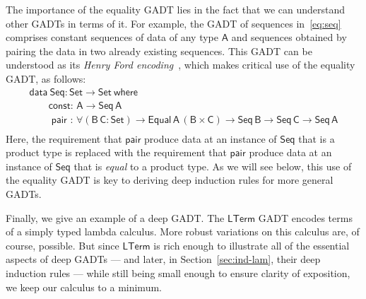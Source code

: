 \documentclass[9pt]{entcs}
\begin{document}
The importance of the equality GADT lies in the fact that we can
understand other GADTs in terms of it. For example, the GADT of
sequences in~\eqref{eq:seq} comprises constant sequences of data of
any type $\mathsf{A}$ and sequences obtained by pairing the data in
two already existing sequences. This GADT can be understood as its
{\em Henry Ford encoding}~\cite{ch03,hin03,mcb99,sjsv09,sp04}, which
makes critical use of the equality GADT, as follows:
\begin{equation}\label{eq:eq_seq}
\begin{array}{l}
\mathsf{data\ Seq : Set \to Set\ where}\\
\mathsf{\;\;\;\;\;\;\;const :\, A \to Seq\,A}\\ 
\mathsf{\;\;\;\;\;\;\;\;pair\,\, :\, \forall (B\,C : Set) \to
  Equal\,A\,(B \times C) \to Seq\,B \to Seq\,C \to Seq\,A}\\ 
\end{array}
\end{equation}
Here, the requirement that $\mathsf{pair}$ produce data at an
instance of $\mathsf{Seq}$ that is a product type is replaced with the
requirement that $\mathsf{pair}$ produce data at an instance of
$\mathsf{Seq}$ that is \emph{equal} to a product type. As we will see
below, this use of the equality GADT is key to deriving deep induction
rules for more general GADTs.

\vspace*{0.05in}

Finally, we give an example of a deep GADT. The $\mathsf{LTerm}$ GADT
encodes terms of a simply typed lambda calculus. More robust
variations on this calculus are, of course, possible. But since
$\mathsf{LTerm}$ is rich enough to illustrate all of the essential
aspects of deep GADTs --- and later, in Section~\ref{sec:ind-lam},
their deep induction rules --- while still being small enough to
ensure clarity of exposition, we keep our calculus to a minimum.
\end{document}
